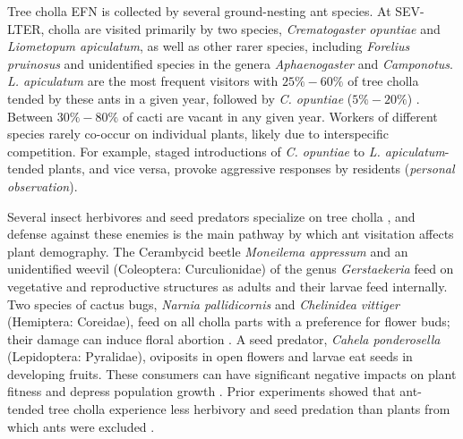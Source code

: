 \documentclass[11pt]{article}
\begin{document}
Tree cholla EFN is collected by several ground-nesting ant species. 
At SEV-LTER, cholla are visited primarily by two species, \textit{Crematogaster opuntiae} and \textit{Liometopum apiculatum}, as well as other rarer species, including \textit{Forelius pruinosus} and unidentified species in the genera \textit{Aphaenogaster} and \textit{Camponotus}.
\textit{L. apiculatum} are the most frequent visitors with $25\% - 60\%$ of tree cholla tended by these ants in a given year, followed by \textit{C. opuntiae} ($5\% - 20\%$) \citep{Donald2022}. 
Between $ 30\% - 80\%$ of cacti are vacant in any given year. 
Workers of different species rarely co-occur on individual plants, likely due to interspecific competition. 
For example, staged introductions of \textit{C. opuntiae} to \textit{L. apiculatum}-tended plants, and vice versa, provoke aggressive responses by residents (\textit{personal observation}).


Several insect herbivores and seed predators specialize on tree cholla \citep{Mann1969}, and defense against these enemies is the main pathway by which ant visitation affects plant demography. 
The Cerambycid beetle \textit{Moneilema appressum} and an unidentified weevil (Coleoptera: Curculionidae) of the genus \textit{Gerstaekeria} feed on vegetative and reproductive structures as adults and their larvae feed internally. 
Two species of cactus bugs, \textit{Narnia pallidicornis} and \textit{Chelinidea vittiger} (Hemiptera: Coreidae), feed on all cholla parts with a preference for flower buds; their damage can induce floral abortion \citep{Miller2006}. 
A seed predator, \textit{Cahela ponderosella} (Lepidoptera: Pyralidae), oviposits in open flowers and larvae eat seeds in developing fruits. 
These consumers can have significant negative impacts on plant fitness and depress population growth \citep{Miller2009}.
Prior experiments showed that ant-tended tree cholla experience less herbivory and seed predation than plants from which ants were excluded \citep{Miller2007,Ohm2014}. 
\end{document}
